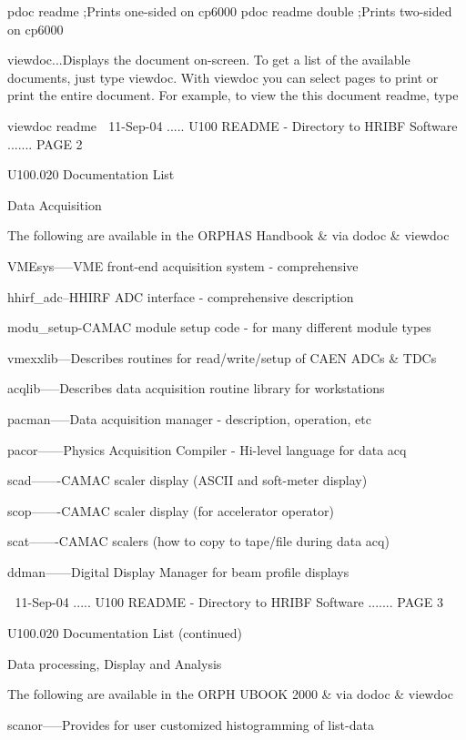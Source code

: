           pdoc  readme         ;Prints one-sided on cp6000
          pdoc  readme double  ;Prints two-sided on cp6000
 
   viewdoc...Displays  the  document on-screen. To get a list of the available
          documents, just type viewdoc.  With viewdoc you can select  pages to
          print  or  print the entire document.  For example, to view the this
          document readme, type
 
          viewdoc readme
    
   11-Sep-04 ..... U100  README - Directory to HRIBF Software ....... PAGE   2
 
 
   U100.020  Documentation List
 
 
   Data Acquisition
 
 
   The following are available in the ORPHAS Handbook & via dodoc & viewdoc
 
 
   VMEsys-----VME front-end acquisition system - comprehensive
 
   hhirf_adc--HHIRF ADC interface - comprehensive description
 
   modu_setup-CAMAC module setup code - for many different module types
 
   vmexxlib---Describes routines for read/write/setup of CAEN ADCs & TDCs
 
   acqlib-----Describes data acquisition routine library for workstations
 
   pacman-----Data acquisition manager - description, operation, etc
 
   pacor------Physics Acquisition Compiler - Hi-level language for data acq
 
   scad-------CAMAC scaler display (ASCII and soft-meter display)
 
   scop-------CAMAC scaler display (for accelerator operator)
 
   scat-------CAMAC scalers (how to copy to tape/file during data acq)
 
   ddman------Digital Display Manager for beam profile displays
 
    
   11-Sep-04 ..... U100  README - Directory to HRIBF Software ....... PAGE   3
 
 
   U100.020  Documentation List (continued)
 
 
   Data processing, Display and Analysis
 
 
   The following are available in the ORPH UBOOK 2000 & via dodoc & viewdoc
 
 
   scanor-----Provides for user customized histogramming of list-data
 

